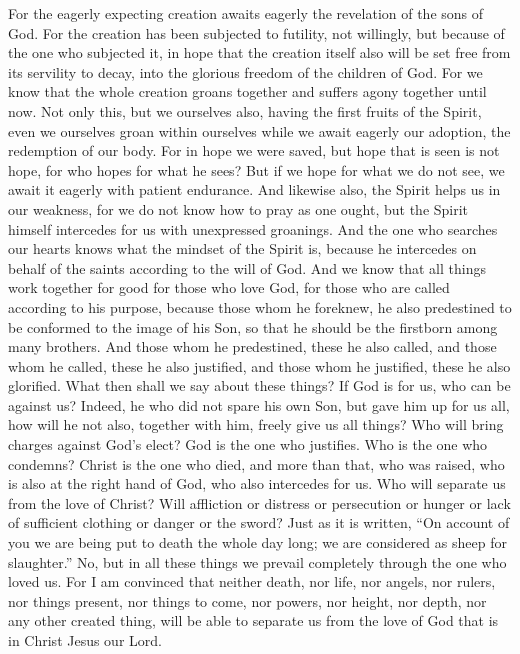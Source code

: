 \begin{biblechapter}
\verse For the eagerly expecting creation awaits eagerly the revelation of the sons of God.
\verse For the creation has been subjected to futility, not willingly, but because of the one who subjected it, in hope
\verse that the creation itself also will be set free from its servility to decay, into the glorious freedom of the children of God.
\verse For we know that the whole creation groans together and suffers agony together until now.
\verse Not only this, but we ourselves also, having the first fruits of the Spirit, even we ourselves groan within ourselves while we await eagerly our adoption, the redemption of our body.
\verse For in hope we were saved, but hope that is seen is not hope, for who hopes for what he sees?
\verse But if we hope for what we do not see, we await it eagerly with patient endurance.
\verse And likewise also, the Spirit helps us in our weakness, for we do not know how to pray as one ought, but the Spirit himself intercedes for us with unexpressed groanings.
\verse And the one who searches our hearts knows what the mindset of the Spirit is, because he intercedes on behalf of the saints according to the will of God.
\verse And we know that all things work together for good for those who love God, for those who are called according to his purpose,
\verse because those whom he foreknew, he also predestined to be conformed to the image of his Son, so that he should be the firstborn among many brothers.
\verse And those whom he predestined, these he also called, and those whom he called, these he also justified, and those whom he justified, these he also glorified.
 What then shall we say about these things? If God is for us, who can be against us?
\verse Indeed, he who did not spare his own Son, but gave him up for us all, how will he not also, together with him, freely give us all things?
\verse Who will bring charges against God’s elect? God is the one who justifies.
\verse Who is the one who condemns? Christ is the one who died, and more than that, who was raised, who is also at the right hand of God, who also intercedes for us.
\verse Who will separate us from the love of Christ? Will affliction or distress or persecution or hunger or lack of sufficient clothing or danger or the sword?
\verse Just as it is written, “On account of you we are being put to death the whole day long; 
we are considered as sheep for slaughter.”
\verse No, but in all these things we prevail completely through the one who loved us.
\verse For I am convinced that neither death, nor life, nor angels, nor rulers, nor things present, nor things to come, nor powers,
\verse nor height, nor depth, nor any other created thing, will be able to separate us from the love of God that is in Christ Jesus our Lord.
\end{biblechapter}

